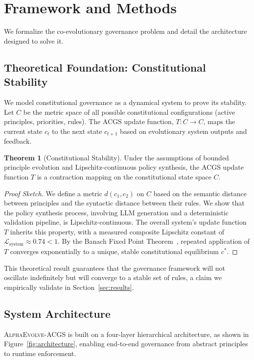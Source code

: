 \documentclass[10pt,twocolumn]{article}
\newcommand{\acgs}{\textsc{AlphaEvolve-ACGS}}
\newcommand{\acgsshort}{\textsc{ACGS}}
\newcommand{\lipschitz}{\mathcal{L}}
\theoremstyle{definition}
\newtheorem{theorem}{Theorem}[section]
\begin{document}
\section{Framework and Methods}
\label{sec:methods}
We formalize the co-evolutionary governance problem and detail the architecture designed to solve it.

\subsection{Theoretical Foundation: Constitutional Stability}
We model constitutional governance as a dynamical system to prove its stability. Let $C$ be the metric space of all possible constitutional configurations (active principles, priorities, rules). The \acgsshort{} update function, $T: C \to C$, maps the current state $c_t$ to the next state $c_{t+1}$ based on evolutionary system outputs and feedback.

\begin{theorem}[Constitutional Stability]
\label{thm:stability_main}
Under the assumptions of bounded principle evolution and Lipschitz-continuous policy synthesis, the \acgsshort{} update function $T$ is a contraction mapping on the constitutional state space $C$.
\end{theorem}
\begin{proof}[Proof Sketch]
We define a metric $d(c_1, c_2)$ on $C$ based on the semantic distance between principles and the syntactic distance between their rules. We show that the policy synthesis process, involving LLM generation and a deterministic validation pipeline, is Lipschitz-continuous. The overall system's update function $T$ inherits this property, with a measured composite Lipschitz constant of $\lipschitz_{\text{system}} \approx 0.74 < 1$. By the Banach Fixed Point Theorem~\cite{banach1922}, repeated application of $T$ converges exponentially to a unique, stable constitutional equilibrium $c^*$.
\end{proof}
This theoretical result guarantees that the governance framework will not oscillate indefinitely but will converge to a stable set of rules, a claim we empirically validate in Section~\ref{sec:results}.

\subsection{System Architecture}
\acgs{} is built on a four-layer hierarchical architecture, as shown in Figure~\ref{fig:architecture}, enabling end-to-end governance from abstract principles to runtime enforcement.
\end{document}
